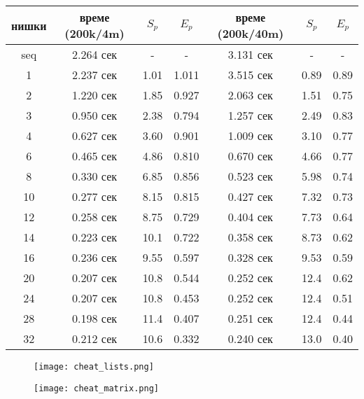 \begin{center}
\begin{tabular}{ c | c c c | c c c | }
  нишки & време (200k/4m) & $S_p$ & $E_p$ & време (200k/40m) & $S_p$ & $E_p$ \\
  \hline
  seq & 2.264 сек & - & - & 3.131 сек & - & - \\
  1  & 2.237 сек & 1.01 & 1.011 & 3.515 сек & 0.89 & 0.89 \\
  2  & 1.220 сек & 1.85 & 0.927 & 2.063 сек & 1.51 & 0.75 \\
  3  & 0.950 сек & 2.38 & 0.794 & 1.257 сек & 2.49 & 0.83 \\
  4  & 0.627 сек & 3.60 & 0.901 & 1.009 сек & 3.10 & 0.77 \\
  6  & 0.465 сек & 4.86 & 0.810 & 0.670 сек & 4.66 & 0.77 \\
  8  & 0.330 сек & 6.85 & 0.856 & 0.523 сек & 5.98 & 0.74 \\
  10 & 0.277 сек & 8.15 & 0.815 & 0.427 сек & 7.32 & 0.73 \\
  12 & 0.258 сек & 8.75 & 0.729 & 0.404 сек & 7.73 & 0.64 \\
  14 & 0.223 сек & 10.1 & 0.722 & 0.358 сек & 8.73 & 0.62 \\
  16 & 0.236 сек & 9.55 & 0.597 & 0.328 сек & 9.53 & 0.59 \\
  20 & 0.207 сек & 10.8 & 0.544 & 0.252 сек & 12.4 & 0.62 \\
  24 & 0.207 сек & 10.8 & 0.453 & 0.252 сек & 12.4 & 0.51 \\
  28 & 0.198 сек & 11.4 & 0.407 & 0.251 сек & 12.4 & 0.44 \\
  32 & 0.212 сек & 10.6 & 0.332 & 0.240 сек & 13.0 & 0.40 \\
\end{tabular}
\end{center}

\begin{figure}[H]
  \centering
  \begin{minipage}{.45\textwidth}
    \centering
    \texttt{[image: cheat\_lists.png]}
  \end{minipage}
  \begin{minipage}{.45\textwidth}
    \centering
    \texttt{[image: cheat\_matrix.png]}
  \end{minipage}
\end{figure}
